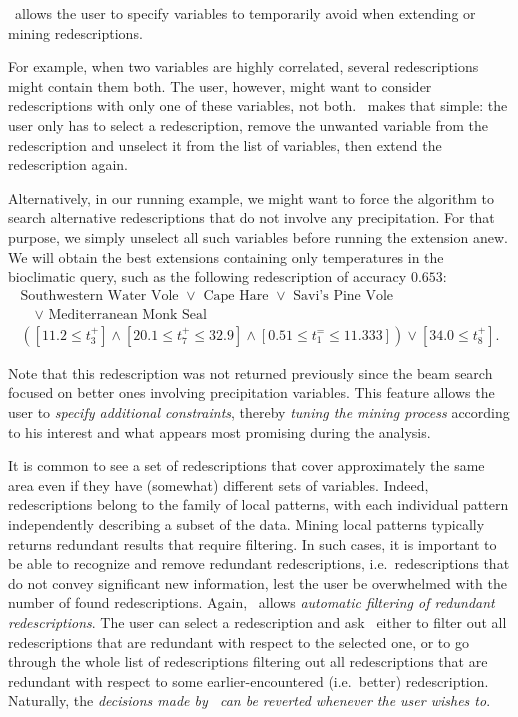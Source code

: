 \Siren\ allows the user to specify variables to temporarily 
avoid when extending or mining redescriptions.

For example, when two variables are highly
correlated, several redescriptions might contain them
both. The user, however, might want to consider
redescriptions with only one of these variables, not
both. \Siren\ makes that simple: the user only has to select a
redescription, remove the unwanted variable from the
redescription and unselect it from the list of variables, then extend the
redescription again. 

Alternatively, in our running example, we might want to force the
algorithm to search alternative redescriptions that do not involve any
 precipitation. For that purpose, we simply unselect all such
variables before running the extension anew. We will obtain the best
extensions containing only temperatures in the bioclimatic query, such
as the following redescription of accuracy $0.653$:
\begin{equation*}
\begin{array}{l}
\text{Southwestern Water Vole }\lor\text{ Cape Hare }\lor\text{ Savi's Pine Vole }\\[1mm]
\quad\lor\text{ Mediterranean Monk Seal}\\[3mm]
( [11.2 \leq t_{3}^{+}] \land  [20.1 \leq t_{7}^{+} \leq 32.9] %
\land  [0.51 \leq t_{1}^{=} \leq 11.333]) \lor  [34.0 \leq t_{8}^{+}].
\end{array}
\end{equation*}

Note that this redescription was not returned previously since the
beam search focused on better ones involving precipitation variables.
This feature allows the user to \emph{specify additional constraints},
thereby \emph{tuning the mining process} according to his interest and
what appears most promising during the analysis.

\label{sec:filt-redund-redescr}
It is common to see a set of redescriptions that cover approximately
the same area even if they have (somewhat) different sets of
variables.  Indeed, redescriptions belong to the family of local
patterns, with each individual pattern independently describing a
subset of the data. Mining local patterns typically returns redundant
results that require filtering.  In such cases, it is important to be
able to recognize and remove redundant redescriptions, i.e.\
redescriptions that do not convey significant new information, lest
the user be overwhelmed with the number of found
redescriptions. Again, \Siren\ allows \emph{automatic filtering of
  redundant redescriptions}. The user can select a redescription and
ask \Siren\ either to filter out all redescriptions that are redundant
with respect to the selected one, or to go through the whole list of
redescriptions filtering out all redescriptions that are redundant
with respect to some earlier-encountered (i.e.\ better)
redescription. Naturally, the \emph{decisions made by \Siren\ can be
reverted whenever the user wishes to}.


